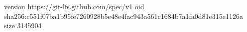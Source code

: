 version https://git-lfs.github.com/spec/v1
oid sha256:c551f07ba1b95fe7260928b5e48e4fac943a561c1684b7a1fa0d81e315e1126a
size 3145904
